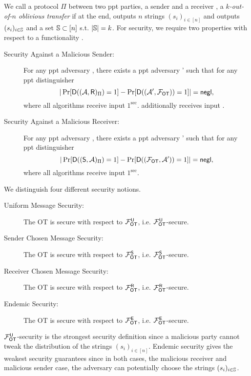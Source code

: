 \begin{definition}\label{def:otSec}
We call a protocol $\Pi$ between two ppt parties, a sender \send and a receiver \rec, a \emph{$k$-out-of-$n$ oblivious transfer} if %
at the end, \send outputs $n$ strings $(s_i)_{i\in[n]}$ and \rec outputs $(s_i)_{i\in\mathsf{\mathbb S}}$ and a set $\mathsf{\mathbb S}\subset[n]$ s.t. $|\mathsf{\mathbb S}|=k$. For security, we require two properties with respect to a functionality \OOT.
\begin{description}
\item[Security Against a Malicious Sender:] For any ppt adversary \Adv, there exists a ppt adversary \Adv' such that for any ppt distinguisher \D
$$
|\Pr[\mathsf D((\mathcal{A},\mathsf{R})_{\Pi})=1] -\Pr[\mathsf D( (\mathcal{A}', \mathcal{F}_{\mathsf{OT}}))=1]|=\mathsf{negl},
$$
where all algorithms receive input $1^\sec$. \rec additionally receives input \set.
\item[Security Against a Malicious Receiver:] For any ppt adversary \Adv, there exists a ppt adversary \Adv' such that for any ppt distinguisher \D
$$
|\Pr[\mathsf D((\mathsf{S}, \mathcal{A})_{\Pi})=1] -\Pr[\mathsf D((\mathcal{F}_{\mathsf{OT}},\mathcal{A}'))=1]|=\mathsf{negl},
$$
where all algorithms receive input $1^\sec$.
\end{description}


We distinguish four different security notions.
\begin{description}
\item[Uniform Message Security:] The OT is secure with respect to $\mathcal{F}_{\mathsf{OT}}^\mathsf{U}$, i.e. $\mathcal{F}_{\mathsf{OT}}^\mathsf{U}$-secure.
\item[Sender Chosen Message Security:] The OT is secure with respect to $\mathcal{F}_{\mathsf{OT}}^{\mathsf{S}}$, i.e. $\mathcal{F}_{\mathsf{OT}}^{\mathsf{S}}$-secure.
\item[Receiver Chosen Message Security:] The OT is secure with respect to $\mathcal{F}_{\mathsf{OT}}^{\mathsf{R}}$, i.e. $\mathcal{F}_{\mathsf{OT}}^{\mathsf{R}}$-secure.
\item[Endemic Security:] The OT is secure with respect to $\mathcal{F}_{\mathsf{OT}}^{\mathsf{E}}$, i.e. $\mathcal{F}_{\mathsf{OT}}^{\mathsf{E}}$-secure.
\end{description}


\end{definition}

\begin{remark}
$\mathcal{F}_{\mathsf{OT}}^\mathsf{U}$-security is the strongest security definition since a malicious party cannot tweak the distribution of the strings  $(s_i)_{i\in[n]}$. Endemic security gives the weakest security guarantees since in both cases, the malicious receiver and malicious sender case, the adversary can potentially choose the strings $(s_i)_{i\in\mathsf{\mathbb S}}$.
\end{remark}

